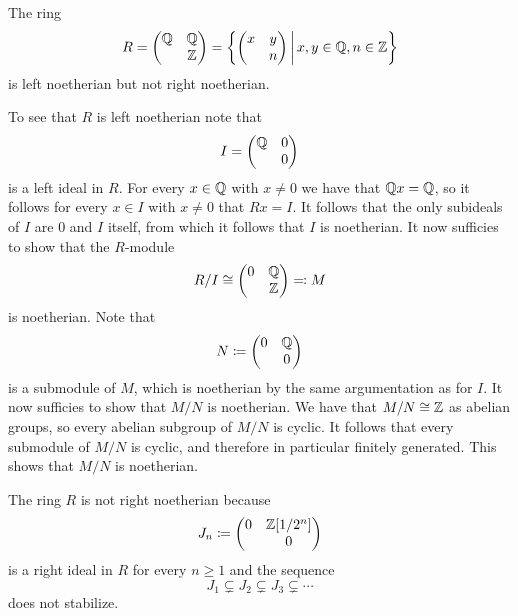 \begin{example}
  The ring
  \[
      R
    = \begin{pmatrix}
        \Rational & \Rational \\
                  & \Integer
      \end{pmatrix}
    = \left\{
        \begin{pmatrix}
          x & y \\
            & n 
        \end{pmatrix}
      \suchthat*
        x, y \in \Rational,
        n \in \Integer
      \right\}
  \]
  is left noetherian but not right noetherian.
  
  To see that $R$ is left noetherian note that
  \[
      I
    = \begin{pmatrix}
        \mathbb{Q} & 0 \\
                  & 0
      \end{pmatrix}
  \]
  is a left ideal in $R$.
  For every $x \in \mathbb{Q}$ with $x \neq 0$ we have that $\mathbb{Q} x = \mathbb{Q}$, so it follows for every $x \in I$ with $x \neq 0$ that $Rx = I$.
  It follows that the only subideals of $I$ are $0$ and $I$ itself, from which it follows that $I$ is noetherian.
  It now sufficies to show that the $R$-module
  \[
            R/I
    \cong   \begin{pmatrix}
              0 & \mathbb{Q} \\
                & \mathbb{Z}
            \end{pmatrix}
    \eqqcolon M
  \]
  is noetherian.
  Note that
  \[
              N
    \coloneqq  \begin{pmatrix}
                0 & \mathbb{Q} \\
                  & 0
              \end{pmatrix}
  \]
  is a submodule of $M$, which is noetherian by the same argumentation as for $I$.
  It now sufficies to show that $M/N$ is noetherian.
  We have that $M/N \cong \mathbb{Z}$ as abelian groups, so every abelian subgroup of $M/N$ is cyclic.
  It follows that every submodule of $M/N$ is cyclic, and therefore in particular finitely generated.
  This shows that $M/N$ is noetherian.
  
  The ring $R$ is not right noetherian because
  \[
              J_n
    \coloneqq  \begin{pmatrix}
                0 & \mathbb{Z}[1/2^n] \\
                  & 0
              \end{pmatrix}
  \]
  is a right ideal in $R$ for every $n \geq 1$ and the sequence
  \[
                J_1
    \subsetneq  J_2
    \subsetneq  J_3
    \subsetneq  \dotsb
  \]
  does not stabilize.
\end{example}



